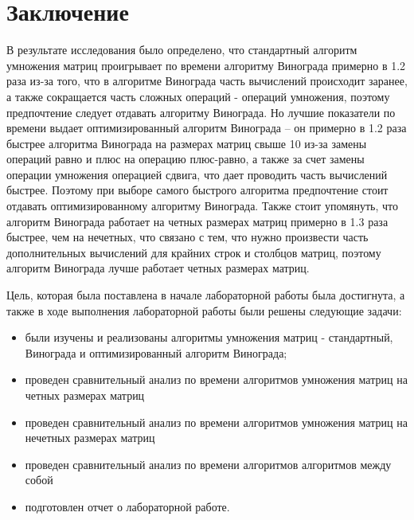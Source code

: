 \chapter*{Заключение}

В результате исследования было определено, что стандартный алгоритм умножения матриц проигрывает
по времени алгоритму Винограда примерно в 1.2 раза из-за того, что в алгоритме Винограда 
часть вычислений происходит заранее, а также сокращается часть сложных операций - операций умножения,
поэтому предпочтение следует отдавать алгоритму Винограда. Но лучшие показатели по времени выдает 
оптимизированный алгоритм Винограда -- он примерно в 1.2 раза быстрее алгоритма Винограда на размерах
матриц свыше 10 из-за замены операций равно и плюс на операцию плюс-равно, а также за счет замены
операции умножения операцией сдвига, что дает проводить часть вычислений быстрее. Поэтому при выборе
самого быстрого алгоритма предпочтение стоит отдавать оптимизированному алгоритму Винограда. Также
стоит упомянуть, что алгоритм Винограда работает на четных размерах матриц примерно в 1.3 раза
быстрее, чем на нечетных, что связано с тем, что нужно произвести часть дополнительных вычислений
для крайних строк и столбцов матриц, поэтому алгоритм Винограда лучше работает четных размерах матриц.


Цель, которая была поставлена в начале лабораторной работы была достигнута, а также в ходе выполнения лабораторной работы были решены следующие задачи:

\begin{itemize}
	\item были изучены и реализованы алгоритмы умножения матриц - стандартный, Винограда и оптимизированный алгоритм Винограда;
    \item проведен сравнительный анализ по времени алгоритмов умножения матриц на четных размерах матриц
	\item проведен сравнительный анализ по времени алгоритмов умножения матриц на нечетных размерах матриц
	\item проведен сравнительный анализ по времени алгоритмов алгоритмов между собой
	\item подготовлен отчет о лабораторной работе.
\end{itemize}